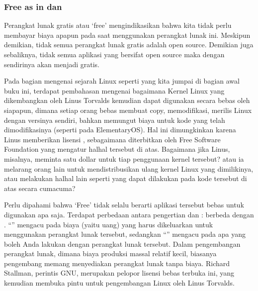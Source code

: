 \documentclass[letterpaper,10pt,english]{sphinxmanual}
\begin{document}
\subsubsection{Free as in  dan }
\label{\detokenize{sesi1/fossgis:free-as-in-free-speech-dan-free-drinks}}
Perangkat lunak gratis atau ‘free’ mengindikasikan bahwa kita tidak perlu membayar biaya apapun pada saat menggunakan perangkat lunak ini. Meskipun demikian, tidak semua perangkat lunak gratis adalah open source. Demikian juga sebaliknya, tidak semua aplikasi yang bersifat open source maka dengan sendirinya akan menjadi gratis.

Pada bagian mengenai sejarah Linux seperti yang kita jumpai di bagian awal buku ini, terdapat pembahasan mengenai bagaimana Kernel Linux yang dikembangkan oleh Linus Torvalds kemudian dapat digunakan secara bebas oleh siapapun, dimana setiap orang bebas membuat copy, memodifikasi, merilis Linux dengan versinya sendiri, bahkan memungut biaya untuk kode yang telah dimodifikasinya (seperti pada ElementaryOS). Hal ini dimungkinkan karena Linus memberikan lisensi , sebagaimana diterbitkan oleh Free Software Foundation yang mengatur hal\sphinxhyphen{}hal tersebut di atas. Bagaimana jika Linus, misalnya, meminta satu dollar untuk tiap penggunaan kernel tersebut? atau ia melarang orang lain untuk mendistribusikan ulang kernel Linux yang dimilikinya, atau melakukan hal\sphinxhyphen{}hal lain seperti yang dapat dilakukan pada kode tersebut di atas secara cuma\sphinxhyphen{}cuma?

Perlu dipahami bahwa ‘Free’ tidak selalu berarti aplikasi tersebut bebas untuk digunakan apa saja. Terdapat perbedaan antara pengertian  dan :  berbeda dengan . “” mengacu pada biaya (yaitu uang) yang harus dikeluarkan untuk menggunakan perangkat lunak tersebut, sedangkan “” mengacu pada apa yang boleh Anda lakukan dengan perangkat lunak tersebut. Dalam pengembangan perangkat lunak, dimana biaya produksi massal relatif kecil, biasanya pengembang memang menyediakan perangkat lunak tanpa biaya. Richard Stallman, perintis GNU, merupakan pelopor lisensi bebas terbuka ini, yang kemudian membuka pintu untuk pengembangan Linux oleh Linus Torvalds.
\end{document}
